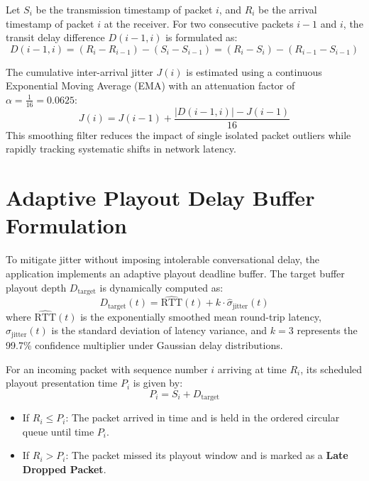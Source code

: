 \documentclass[12pt, a4paper]{report}
\begin{document}
Let $S_i$ be the transmission timestamp of packet $i$, and $R_i$ be the arrival timestamp of packet $i$ at the receiver. For two consecutive packets $i-1$ and $i$, the transit delay difference $D(i-1, i)$ is formulated as:
\begin{equation}
D(i-1, i) = (R_i - R_{i-1}) - (S_i - S_{i-1}) = (R_i - S_i) - (R_{i-1} - S_{i-1})
\end{equation}

The cumulative inter-arrival jitter $J(i)$ is estimated using a continuous Exponential Moving Average (EMA) with an attenuation factor of $\alpha = \frac{1}{16} = 0.0625$:
\begin{equation}
J(i) = J(i-1) + \frac{|D(i-1, i)| - J(i-1)}{16}
\end{equation}
This smoothing filter reduces the impact of single isolated packet outliers while rapidly tracking systematic shifts in network latency.

\section{Adaptive Playout Delay Buffer Formulation}
To mitigate jitter without imposing intolerable conversational delay, the application implements an adaptive playout deadline buffer. The target buffer playout depth $D_{\text{target}}$ is dynamically computed as:
\begin{equation}
D_{\text{target}}(t) = \widehat{\text{RTT}}(t) + k \cdot \widehat{\sigma}_{\text{jitter}}(t)
\end{equation}
where $\widehat{\text{RTT}}(t)$ is the exponentially smoothed mean round-trip latency, $\widehat{\sigma}_{\text{jitter}}(t)$ is the standard deviation of latency variance, and $k = 3$ represents the 99.7\% confidence multiplier under Gaussian delay distributions.

For an incoming packet with sequence number $i$ arriving at time $R_i$, its scheduled playout presentation time $P_i$ is given by:
\begin{equation}
P_i = S_i + D_{\text{target}}
\end{equation}
\begin{itemize}
    \item If $R_i \le P_i$: The packet arrived in time and is held in the ordered circular queue until time $P_i$.
    \item If $R_i > P_i$: The packet missed its playout window and is marked as a \textbf{Late Dropped Packet}.
\end{itemize}
\end{document}
